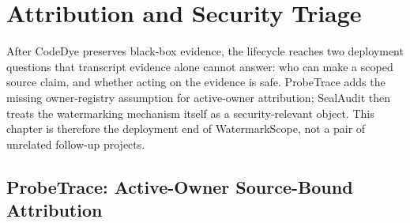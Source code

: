 \chapter{Attribution and Security Triage}\label{cpt:attribution-triage}

After CodeDye preserves black-box evidence, the lifecycle reaches two deployment questions that transcript evidence alone cannot answer: who can make a scoped source claim, and whether acting on the evidence is safe. ProbeTrace adds the missing owner-registry assumption for active-owner attribution; SealAudit then treats the watermarking mechanism itself as a security-relevant object. This chapter is therefore the deployment end of WatermarkScope, not a pair of unrelated follow-up projects.

\section{ProbeTrace: Active-Owner Source-Bound Attribution}


